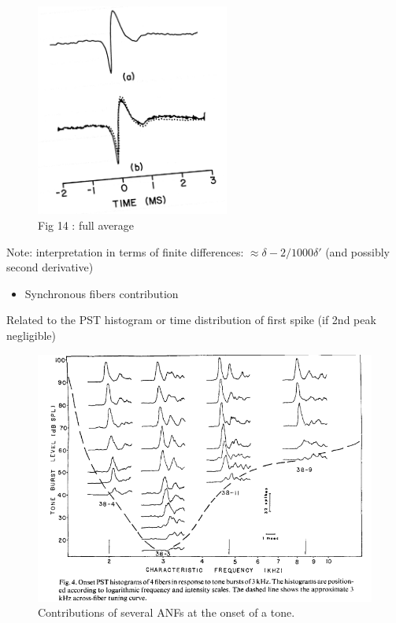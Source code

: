 \documentclass[]{article}
\providecommand{\tightlist}{%
  \setlength{\itemsep}{0pt}\setlength{\parskip}{0pt}}
\begin{document}
\begin{figure}
\centering
\includegraphics[width=2.50000in]{./figures/UR.png}
\caption{Fig 14 \citep{Wang1979} : full average}
\end{figure}

Note: interpretation in terms of finite differences:
\(\approx \delta - 2/1000 \delta'\) (and possibly second derivative)

\clearpage

\begin{itemize}
\tightlist
\item
  Synchronous fibers contribution
\end{itemize}

Related to the PST histogram or time distribution of first spike (if 2nd
peak negligible)

\begin{figure}
\centering
\includegraphics[width=5.00000in]{./figures/PST_tone.png}
\caption{Contributions of several ANFs at the onset of a tone.
\citep{Ozdamar1978}}
\end{figure}
\end{document}
